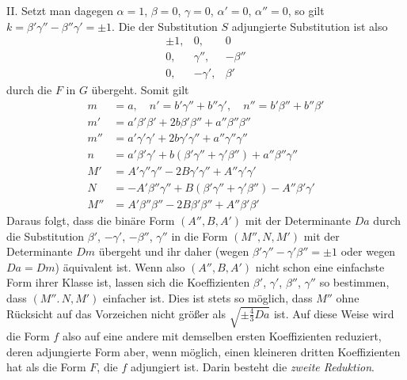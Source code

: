 II. Setzt man dagegen \(\alpha=1\), \(\beta=0\), \(\gamma=0\), \(\alpha'=0\), \(\alpha''=0\), so gilt \(k=\beta'\gamma''-\beta''\gamma'=\pm1\). Die der Substitution \(S\) adjungierte Substitution ist also
\[
\begin{array}{rrr}
\pm1,&0,&0\\
0,&\gamma'',&-\beta''\\
0,&-\gamma',&\beta'
\end{array}
\]
durch die \(F\) in \(G\) übergeht. Somit gilt
\[
\begin{aligned}
m&=a,\quad n'=b'\gamma''+b''\gamma',\quad n''=b'\beta''+b''\beta'\\
m'&=a'\beta'\beta'+2b\beta'\beta''+a''\beta''\beta''\\
m''&=a'\gamma'\gamma'+2b\gamma'\gamma''+a''\gamma''\gamma''\\
n&=a'\beta'\gamma'+b(\beta'\gamma''+\gamma'\beta'')+a''\beta''\gamma''\\
M'&=A'\gamma''\gamma''-2B\gamma'\gamma''+A''\gamma'\gamma'\\
N&=-A'\beta''\gamma''+B(\beta'\gamma''+\gamma'\beta'')-A''\beta'\gamma'\\
M''&=A'\beta''\beta''-2B\beta'\beta''+A''\beta'\beta'
\end{aligned}
\]
Daraus folgt, dass die binäre Form \((A'',B,A')\) mit der Determinante \(Da\) durch die Substitution \(\beta'\), \(-\gamma'\), \(-\beta''\), \(\gamma''\) in die Form \((M'',N,M')\) mit der Determinante \(Dm\) übergeht und ihr daher (wegen \(\beta'\gamma''-\gamma'\beta''=\pm1\) oder wegen \(Da=Dm\)) äquivalent ist. Wenn also \((A'',B,A')\) nicht schon eine einfachste Form ihrer Klasse ist, lassen sich die Koeffizienten \(\beta'\), \(\gamma'\), \(\beta''\), \(\gamma''\) so bestimmen, dass \((M''.\,N,M')\) einfacher ist. Dies ist stets so möglich, dass \(M''\) ohne Rücksicht auf das Vorzeichen nicht größer als \(\sqrt{\pm\frac{4}{3}Da}\) ist. Auf diese Weise wird die Form \(f\) also auf eine andere mit demselben ersten Koeffizienten reduziert, deren adjungierte Form aber, wenn möglich, einen kleineren dritten Koeffizienten hat als die Form \(F\), die \(f\) adjungiert ist. Darin besteht die \emph{zweite Reduktion}.

